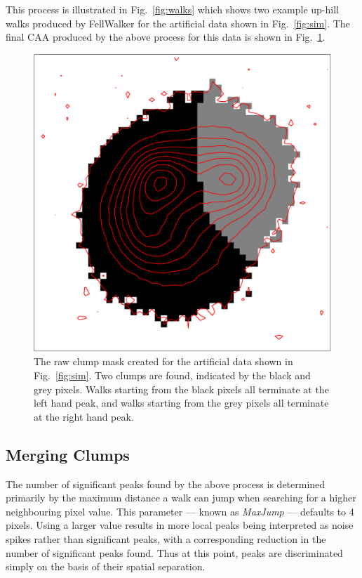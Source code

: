 \documentclass[final,authoryear,5p,times,twocolumn]{elsarticle}
\begin{document}
This process is illustrated in Fig.~\ref{fig:walks} which shows two
example up-hill walks produced by FellWalker for the artificial data shown
in Fig.~\ref{fig:sim}. The final CAA produced by the above process for
this data is shown in Fig.~\ref{fig:rawmask}.

\begin{figure}
\includegraphics[width=\columnwidth]{rawmask}
\caption{The raw clump mask created for the artificial data shown in
Fig.~\ref{fig:sim}. Two clumps are found, indicated by the black and grey
pixels. Walks starting from the black pixels all terminate at the left
hand peak, and walks starting from the grey pixels all terminate at the
right hand peak.}
\label{fig:rawmask}
\end{figure}


\subsection{Merging Clumps}

The number of significant peaks found by the above process is determined
primarily by the maximum distance a walk can jump when searching for a
higher neighbouring pixel value. This parameter --- known as \emph{MaxJump}
--- defaults to 4 pixels. Using a larger value results in more local peaks
being interpreted as noise spikes rather than significant peaks, with a
corresponding reduction in the number of significant peaks found. Thus at
this point, peaks are discriminated simply on the basis of their spatial
separation.
\end{document}

